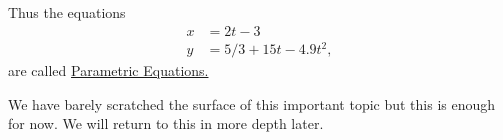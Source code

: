 Thus the equations 
\begin{align*}
  x&=2t-3\\
  y&=5/3 + 15t-4.9t^2,
\end{align*}
are called  \underline{Parametric Equations.}

We have barely scratched the surface of this important topic but this
is enough for now. We will return to this in more depth later.












